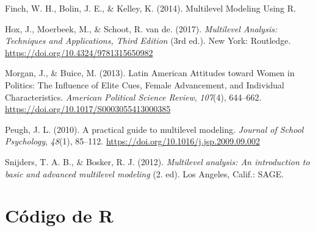 \documentclass[
  12pt,
  a4paper,
]{article}
\newlength{\cslhangindent}
\newlength{\cslentryspacingunit} %
\newenvironment{CSLReferences}[2] %
 {%
  \setlength{\parindent}{0pt}
  \ifodd #1
  \let\oldpar\par
  \def\par{\hangindent=\cslhangindent\oldpar}
  \fi
  \setlength{\parskip}{#2\cslentryspacingunit}
 }%
 {}
\begin{document}
\hypertarget{refs}{}
\begin{CSLReferences}{1}{0}
\leavevmode{}%
Finch, W. H., Bolin, J. E., \& Kelley, K. (2014). Multilevel {Modeling Using R}.

\leavevmode{}%
Hox, J., Moerbeek, M., \& Schoot, R. van de. (2017). \emph{Multilevel {Analysis}: {Techniques} and {Applications}, {Third Edition}} (3rd ed.). New York: Routledge. \url{https://doi.org/10.4324/9781315650982}

\leavevmode{}%
Morgan, J., \& Buice, M. (2013). Latin {American Attitudes} toward {Women} in {Politics}: {The Influence} of {Elite Cues}, {Female Advancement}, and {Individual Characteristics}. \emph{American Political Science Review}, \emph{107}(4), 644--662. \url{https://doi.org/10.1017/S0003055413000385}

\leavevmode{}%
Peugh, J. L. (2010). A practical guide to multilevel modeling. \emph{Journal of School Psychology}, \emph{48}(1), 85--112. \url{https://doi.org/10.1016/j.jsp.2009.09.002}

\leavevmode{}%
Snijders, T. A. B., \& Bosker, R. J. (2012). \emph{Multilevel analysis: An introduction to basic and advanced multilevel modeling} (2. ed). Los Angeles, Calif.: SAGE.

\end{CSLReferences}

\pagebreak

\hypertarget{cuxf3digo-de-r}{%
\section{Código de R}\label{cuxf3digo-de-r}}
\end{document}
